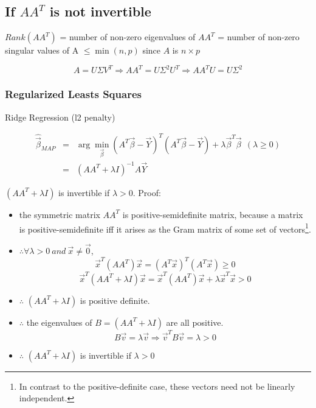 \documentclass[letterpaper,10pt]{article}
\begin{document}
\subsection{If $AA^T$ is not invertible}

$Rank(AA^T)$ = number of non-zero eigenvalues of $AA^T$ = number of non-zero singular values of A $\leq \min(n,p)$ since $A$ is $n\times p$

$$A=U \Sigma V^T \Rightarrow AA^T=U\Sigma^2U^T \Rightarrow AA^T U = U\Sigma^2$$

\subsubsection{Regularized Leasts Squares}

Ridge Regression (l2 penalty)

\begin{equation}
\begin{array}{rcl}
\hat{\vec{\beta}}_{MAP} & = & \arg\min_{\vec{\beta}}(A^T\vec{\beta}-\vec{Y})^T(A^T\vec{\beta}-\vec{Y}) +\lambda \vec{\beta}^T\vec{\beta}~~(\lambda \geq 0) \\
& = & (AA^T + \lambda I)^{-1} A\vec{Y}
\end{array}
\end{equation}

$(AA^T + \lambda I)$ is invertible if $\lambda > 0$. Proof:
\begin{itemize}
	\item the symmetric matrix $AA^T$ is positive-semidefinite matrix, because a matrix is positive-semidefinite iff it arises as the Gram matrix of some set of vectors\footnote{In contrast to the positive-definite case, these vectors need not be linearly independent.}.
	\item $\therefore \forall \lambda>0~and~\vec{x}\neq\vec{0}$, 
	$$\vec{x}^T(AA^T)\vec{x} = (A^T\vec{x})^T(A^T\vec{x}) \geq 0$$
	$$\vec{x}^T(AA^T+\lambda I)\vec{x} = \vec{x}^T (AA^T) \vec{x} + \lambda \vec{x}^T\vec{x} >0$$
	\item $\therefore$ $(AA^T+\lambda I)$ is positive definite.
	\item $\therefore$ the eigenvalues of $B=(AA^T+\lambda I)$ are all positive. $$B\vec{v}=\lambda\vec{v} \Rightarrow \vec{v}^T B \vec{v} = \lambda >0$$
	\item $\therefore$ $(AA^T + \lambda I)$ is invertible if $\lambda > 0$
\end{itemize}
\end{document}
